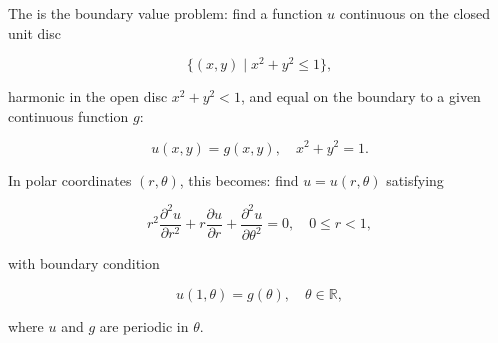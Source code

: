 The  is the boundary value problem: find a function $u$ continuous on the closed unit disc

$$\{(x, y) \mid x^2 + y^2 \leq 1\},$$

harmonic in the open disc $x^2 + y^2 < 1$, and equal on the boundary to a given continuous function $g$:

$$u(x, y) = g(x, y), \quad x^2 + y^2 = 1.$$

In polar coordinates $(r, \theta)$, this becomes: find $u = u(r, \theta)$ satisfying

$$r^2 \frac{\partial^2 u}{\partial r^2} + r \frac{\partial u}{\partial r} + \frac{\partial^2 u}{\partial \theta^2} = 0, \quad 0 \leq r < 1,$$

with boundary condition

$$u(1, \theta) = g(\theta), \quad \theta \in \mathbb{R},$$

where $u$ and $g$ are periodic in $\theta$.
